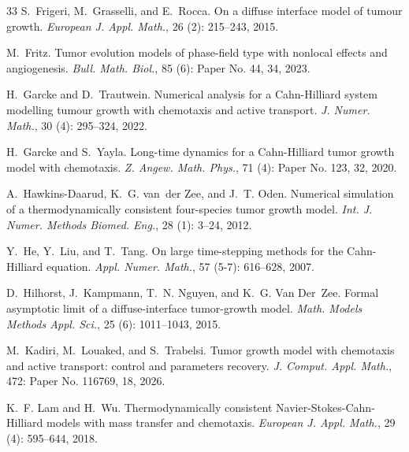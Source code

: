 \documentclass[11pt, reqno]{amsart}
\theoremstyle{definition}
\numberwithin{equation}{section}
\begin{document}
\begin{thebibliography}{33}
	S.~Frigeri, M.~Grasselli, and E.~Rocca.
	\newblock On a diffuse interface model of tumour growth.
	\newblock \emph{European J. Appl. Math.}, 26 (2): 215--243,
	2015.
	
	M.~Fritz.
	\newblock Tumor evolution models of phase-field type with nonlocal effects and
	angiogenesis.
	\newblock \emph{Bull. Math. Biol.}, 85 (6): Paper No. 44, 34,
	2023.
	
	H.~Garcke and D.~Trautwein.
	\newblock Numerical analysis for a {C}ahn-{H}illiard system modelling tumour
	growth with chemotaxis and active transport.
	\newblock \emph{J. Numer. Math.}, 30 (4): 295--324, 2022.
	
	H.~Garcke and S.~Yayla.
	\newblock Long-time dynamics for a {C}ahn-{H}illiard tumor growth model with
	chemotaxis.
	\newblock \emph{Z. Angew. Math. Phys.}, 71 (4): Paper No.
	123, 32, 2020.
	
	A.~Hawkins-Daarud, K.~G. van~der Zee, and J.~T. Oden.
	\newblock Numerical simulation of a thermodynamically consistent four-species
	tumor growth model.
	\newblock \emph{Int. J. Numer. Methods Biomed. Eng.}, 28 (1):
	3--24, 2012.
	
	Y.~He, Y.~Liu, and T.~Tang.
	\newblock On large time-stepping methods for the {C}ahn-{H}illiard equation.
	\newblock \emph{Appl. Numer. Math.}, 57 (5-7): 616--628,
	2007.
	
	D.~Hilhorst, J.~Kampmann, T.~N. Nguyen, and K.~G. Van Der~Zee.
	\newblock Formal asymptotic limit of a diffuse-interface tumor-growth model.
	\newblock \emph{Math. Models Methods Appl. Sci.}, 25 (6):
	1011--1043, 2015.
	
	M.~Kadiri, M.~Louaked, and S.~Trabelsi.
	\newblock Tumor growth model with chemotaxis and active transport: control and
	parameters recovery.
	\newblock \emph{J. Comput. Appl. Math.}, 472: Paper No. 116769, 18,
	2026.
	
	K.~F. Lam and H.~Wu.
	\newblock Thermodynamically consistent {N}avier-{S}tokes-{C}ahn-{H}illiard
	models with mass transfer and chemotaxis.
	\newblock \emph{European J. Appl. Math.}, 29 (4): 595--644,
	2018.
	

\end{thebibliography}
\end{document}
